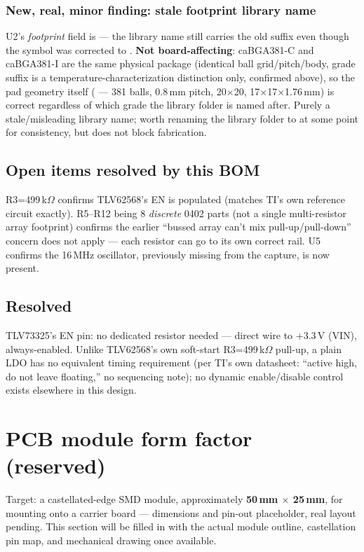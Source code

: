 \subsubsection{New, real, minor finding: stale footprint library name}
U2's \emph{footprint} field is
--- the library name still carries the old  suffix
even though the symbol  was corrected to .
\textbf{Not board-affecting}: caBGA381-C and caBGA381-I are the same
physical package (identical ball grid/pitch/body, grade suffix is a
temperature-characterization distinction only, confirmed above), so
the pad geometry itself
( --- 381 balls, 0.8\,mm pitch,
20$\times$20, 17$\times$17$\times$1.76\,mm) is correct regardless of
which grade the library folder is named after. Purely a stale/misleading
library name; worth renaming the library folder to
 at some point for consistency, but does not block
fabrication.

\subsection{Open items resolved by this BOM}
R3=499\,k$\Omega$ confirms TLV62568's EN is populated (matches TI's
own reference circuit exactly). R5--R12 being 8 \emph{discrete} 0402
parts (not a single multi-resistor array footprint) confirms the
earlier ``bussed array can't mix pull-up/pull-down'' concern does not
apply --- each resistor can go to its own correct rail. U5 confirms
the 16\,MHz oscillator, previously missing from the capture, is now
present.

\subsection{Resolved}
TLV73325's EN pin: no dedicated resistor needed --- direct wire to
+3.3\,V (VIN), always-enabled. Unlike TLV62568's own soft-start
R3=499\,k$\Omega$ pull-up, a plain LDO has no equivalent timing
requirement (per TI's own datasheet: ``active high, do not leave
floating,'' no sequencing note); no dynamic enable/disable control
exists elsewhere in this design.

\section{PCB module form factor (reserved)}
\label{sec:pcb-module}
Target: a castellated-edge SMD module, approximately
\textbf{50\,mm $\times$ 25\,mm}, for mounting onto a carrier board ---
dimensions and pin-out placeholder, real layout pending. This section
will be filled in with the actual module outline, castellation pin
map, and mechanical drawing once available.

